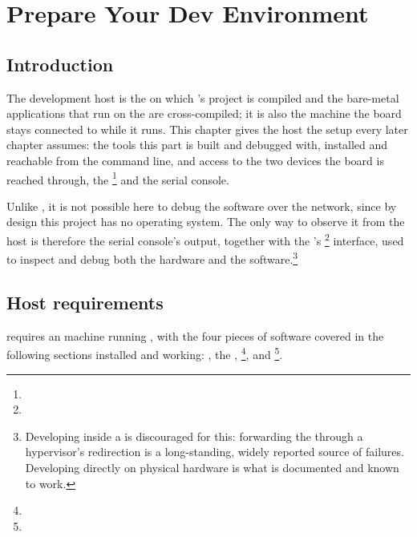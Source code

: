 \chapter{Prepare Your Dev Environment}
\label{chap:fpgasteel-devenv}

\section{Introduction}

The development host is the  on which 's  project is compiled and the bare-metal applications that run on the  are cross-compiled; it is also the machine the  board stays connected to while it runs. This chapter gives the host the setup every later chapter assumes: the tools this part is built and debugged with, installed and reachable from the command line, and access to the two  devices the board is reached through, the \footnote{} and the serial console.

Unlike , it is not possible here to debug the software over the network, since by design this project has no operating system. The only way to observe it from the host is therefore the serial console's output, together with the 's \footnote{} interface, used to inspect and debug both the hardware and the software.\footnote{Developing inside a  is discouraged for this: forwarding the  through a hypervisor's  redirection is a long-standing, widely reported source of  failures. Developing directly on physical  hardware is what is documented and known to work.}

\section{Host requirements}

 requires an  machine running , with the four pieces of software covered in the following sections installed and working: , the , \footnote{}, and \footnote{}.

